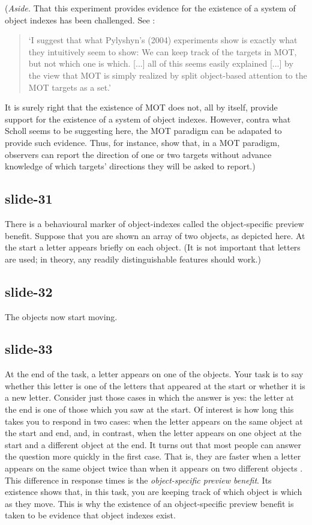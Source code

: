 \documentclass[12pt,\papersize]{extarticle}
\begin{document}
(\emph{Aside.} That this experiment provides evidence for the existence of
a system of object indexes has been challenged.
See \citet[p.\ 59]{scholl:2009_what}:
\begin{quote}
`I suggest that what Pylyshyn’s (2004) experiments show is exactly what they intuitively
seem to show: We can keep track of the targets in MOT, but not which one is which.
[...]
all of this seems easily explained [...] by the view
that MOT is simply realized by split object-based attention to the MOT targets as a set.'
\end{quote}
It is surely right that the existence of MOT does not, all by itself,
provide support for the existence of a system of object indexes.
However, contra what Scholl seems to be suggesting here, the MOT paradigm
can be adapated to provide such evidence.
Thus, for instance, \citet{horowitz:2010_direction} show that, in a MOT paradigm, observers
can report the direction of one or two targets without advance knowledge of which
targets' directions they will be asked to report.)

\subsection{slide-31}
There is a behavioural marker of object-indexes called the object-specific preview benefit.
Suppose that you are shown an array of two objects, as depicted here.
At the start a letter appears briefly on each object.
(It is not important that letters are used; in theory, any readily
distinguishable features should work.)

\subsection{slide-32}
The objects now start moving.

\subsection{slide-33}
At the end of the task, a letter appears on one of the objects.
Your task is to say whether this letter is one of the letters that appeared at the start or whether it is a new letter.
Consider just those cases in which the answer is yes: the letter at the end is one of those which you saw at the start.
Of interest is how long this takes you to respond in two cases: when the letter appears on the same object at the start and end, and, in contrast, when the letter appears on one object at the start and a different object at the end.
It turns out that most people can answer the question more quickly in the first case.
That is, they are faster when a letter appears on the same object twice than when it appears on two different objects
\citep{Kahneman:1992xt}.
This difference in response times is the
\emph{object-specific preview benefit}.
Its existence shows that, in this task, you are keeping track of which object is which as they move.
This is why the existence of an object-specific preview benefit is taken to be evidence that object indexes exist.
\end{document}
